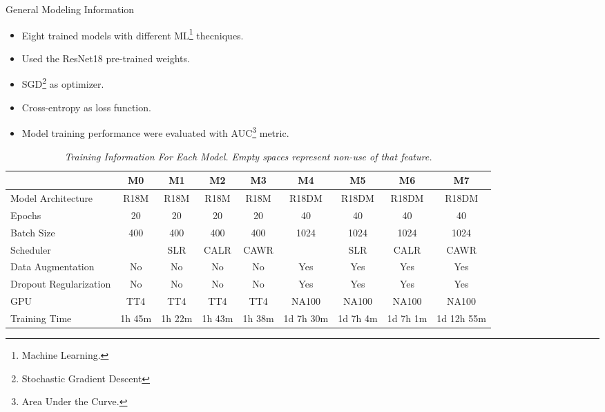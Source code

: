 \documentclass[dvipsnames,mathserif]{beamer}
\begin{document}
{    \begin{frame}

      \large General Modeling Information
      \vspace{0.25cm}

      \footnotesize

      \begin{itemize}
        \item Eight trained models with different ML\footnote{Machine Learning.} thecniques.
        \item Used the ResNet18 pre-trained weights.
        \item SGD\footnote{Stochastic Gradient Descent} as optimizer.
        \item Cross-entropy as loss function.
        \item Model training performance were evaluated with AUC\footnote{Area Under the Curve.} metric.
      \end{itemize}

    \end{frame}

    \begin{frame}


      \begin{table}

        \centering
        \begin{adjustbox}{width=\textwidth}
          \begin{tabular}{lcccccccc}
            \toprule
      & \textbf{M0} & \textbf{M1} & \textbf{M2} & \textbf{M3} & \textbf{M4} & \textbf{M5} & \textbf{M6} & \textbf{M7} \\
      \midrule
            Model Architecture & R18M & R18M & R18M & R18M & R18DM & R18DM & R18DM & R18DM \\
            Epochs & 20 & 20 & 20 & 20 & 40 & 40 & 40 & 40 \\
            Batch Size & 400 & 400 & 400 & 400 & 1024 & 1024 & 1024 & 1024 \\
            Scheduler & & SLR & CALR & CAWR &  & SLR & CALR & CAWR  \\
            Data Augmentation & No & No & No & No  & Yes & Yes & Yes & Yes \\
            Dropout Regularization & No & No & No & No  & Yes & Yes & Yes & Yes \\
            GPU & TT4 & TT4 & TT4 & TT4 & NA100 & NA100 & NA100 & NA100 \\
            Training Time & 1h 45m & 1h 22m & 1h 43m & 1h 38m & 1d 7h 30m & 1d 7h 4m & 1d 7h 1m & 1d 12h 55m \\ \bottomrule
          \end{tabular}
        \end{adjustbox}
        \caption[Training Information For Each Model.]
        {\textit{\footnotesize{Training Information For Each Model. Empty spaces represent non-use of that feature.}}}
        {\label{table:trained-models-information}}
      \end{table}


\end{frame}}
\end{document}

